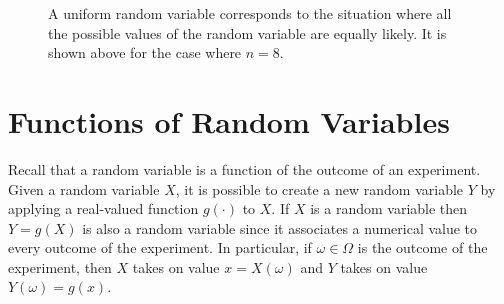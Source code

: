 \begin{figure}[ht]
\begin{center}
\end{center}
\caption{A uniform random variable corresponds to the situation where all the possible values of the random variable are equally likely.
It is shown above for the case where $n = 8$.}
\end{figure}


\section{Functions of Random Variables}
\label{subsection:FunctionDiscreteRV}

Recall that a random variable is a function of the outcome of an experiment.
Given a random variable $X$, it is possible to create a new random variable $Y$ by applying a real-valued function $g(\cdot)$ to $X$.
If $X$ is a random variable then $Y = g(X)$ is also a random variable since it associates a numerical value to every outcome of the experiment.
In particular, if $\omega \in \Omega$ is the outcome of the experiment, then $X$ takes on value $x = X(\omega)$ and $Y$ takes on value $Y(\omega) = g(x)$.

